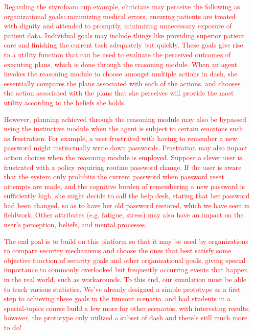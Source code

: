 \documentclass{acm_proc_article-sp}
\begin{document}
\textcolor{red}{Regarding the styrofoam cup example, clinicians may perceive the 
following as organizational goals: minimizing medical errors, ensuring patients 
are treated with dignity and attended to promptly, minimizing unnecessary 
exposure of patient data. Individual goals may include things like providing 
superior patient care and finishing the current task adequately but quickly. 
These goals give rise to a utility function that can be used to evaluate the 
perceived outcomes of executing plans, which is done through 
the reasoning module. When an agent invokes the reasoning module to 
choose amongst multiple actions in {\sc dash}, she essentially compares the 
plans associated with each of the actions, and chooses the action associated
with the plans that she perceives will provide the most utility according to the 
beliefs she holds.}
 
\textcolor{red}{However, planning achieved through the reasoning module
may also be bypassed using the instinctive module when the agent is subject to certain 
emotions such as frustration. For example, a user frustrated with having to 
remember a new password might instinctually write down passwords.
Frustration may also impact action choices when the reasoning 
module is employed. Suppose a clever user is frustrated with a policy requiring
routine password change. If the user is aware that the system only prohibits 
the current password when password reset attempts are made, and the 
cognitive burden of remembering a new password is sufficiently high, 
she might decide to call the help desk, stating that her password had been 
changed, so as to have her old password restored, which we have seen in fieldwork. 
Other attributes (e.g. fatigue, stress) may also have an impact on the user's 
perception, beliefs, and mental processes.}
 
\textcolor{red}{The end goal is to build on this platform so that it may be 
used by organizations to compare security mechanisms and choose the 
ones that best satisfy some objective function of security goals 
and other organizational goals, giving special importance to commonly 
overlooked but frequently occurring events that happen in the real world, 
such as workarounds. To this end, our simulation must be able to 
track various statistics. We've already designed a simple prototype as a first 
step to achieving these goals in the timeout scenario, and had students in 
a special-topics course build a few more for other scenarios, with
interesting results; however, the prototype only utilized a subset of {\sc dash} 
and there's still much more to do!}
\end{document}
